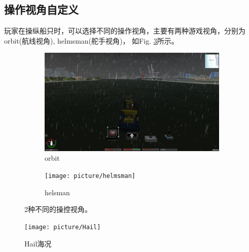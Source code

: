 \documentclass[a4paper,10pt]{article}
\begin{document}
		\subsection{操作视角自定义}
		
		玩家在操纵船只时，可以选择不同的操作视角，主要有两种游戏视角，分别为 orbit(航线视角), helmsman(舵手视角)， 如Fig. \ref{fig: View}所示。
		
		\begin{figure}[htbp] 
			\centering 
			
			\begin{subfigure}{0.3\textwidth}
				\includegraphics[width=\linewidth]{picture/orbit}
				\captionsetup{font=scriptsize}
				\caption{orbit}
				\label{fig: orbit}
			\end{subfigure}
			\begin{subfigure}{0.3\textwidth}
				\texttt{[image: picture/helmsman]}
				\captionsetup{font=scriptsize}
				\caption{helsman}
				\label{fig: helmsman}
			\end{subfigure}
			\captionsetup{font=scriptsize}
			\caption{
				\label{fig: View}						
				2种不同的操控视角。
			}
		\end{figure}
		
		\begin{figure}[htbp]
			\centering				\texttt{[image: picture/Hail]}
			\caption{
				\label{fig: Hail1} 
				Hail海况
			}	
		\end{figure}
		
\end{document}
